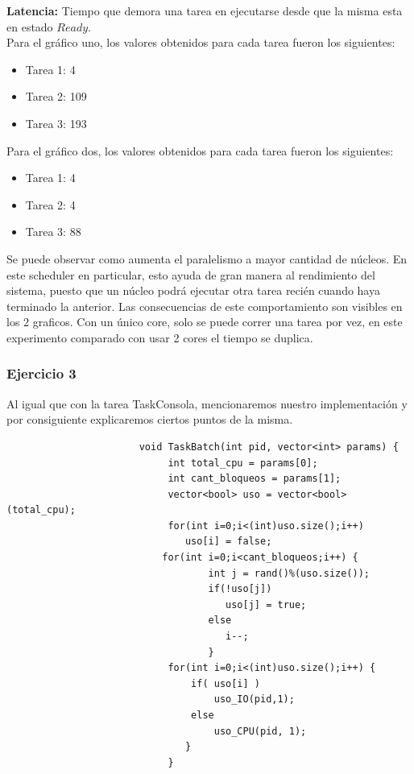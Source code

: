 \textbf{Latencia:} Tiempo que demora una tarea en ejecutarse desde que la misma esta en estado $Ready$.\\

\indent Para el gr\'{a}fico uno, los valores obtenidos para cada tarea fueron los siguientes:\\

\begin{itemize}
 \item Tarea 1: 4
 \item Tarea 2: 109
 \item Tarea 3: 193
\end{itemize}

\indent Para el gr\'{a}fico dos, los valores obtenidos para cada tarea fueron los siguientes:\\

\begin{itemize}
 \item Tarea 1: 4
 \item Tarea 2: 4
 \item Tarea 3: 88
\end{itemize}

\indent Se puede observar como aumenta el paralelismo a mayor cantidad de núcleos. 
En este scheduler en particular, esto ayuda de gran manera al rendimiento del sistema, puesto que un núcleo podrá ejecutar otra tarea 
recién cuando haya terminado la anterior. Las consecuencias de este comportamiento son visibles en los 2 graficos. Con un \'{u}nico core, 
solo se puede correr una tarea por vez, en este experimento comparado con usar 2 cores el tiempo se duplica.\\

\subsubsection[Resolución Ejercicio 3]{Ejercicio 3}

\indent Al igual que con la tarea TaskConsola, mencionaremos nuestro implementación y por consiguiente  
explicaremos ciertos puntos de la misma.\\
 \begin{verbatim}
                       void TaskBatch(int pid, vector<int> params) {
                            int total_cpu = params[0];
                            int cant_bloqueos = params[1];
                            vector<bool> uso = vector<bool>(total_cpu);
                            for(int i=0;i<(int)uso.size();i++) 
                               uso[i] = false;
	                       for(int i=0;i<cant_bloqueos;i++) {
                                   int j = rand()%(uso.size());
                                   if(!uso[j])
                                      uso[j] = true;
                                   else
                                      i--; 
                                   }
                            for(int i=0;i<(int)uso.size();i++) {
                                if( uso[i] )
                                    uso_IO(pid,1); 
                                else
                                    uso_CPU(pid, 1); 
                               }
                            }
 \end{verbatim}


